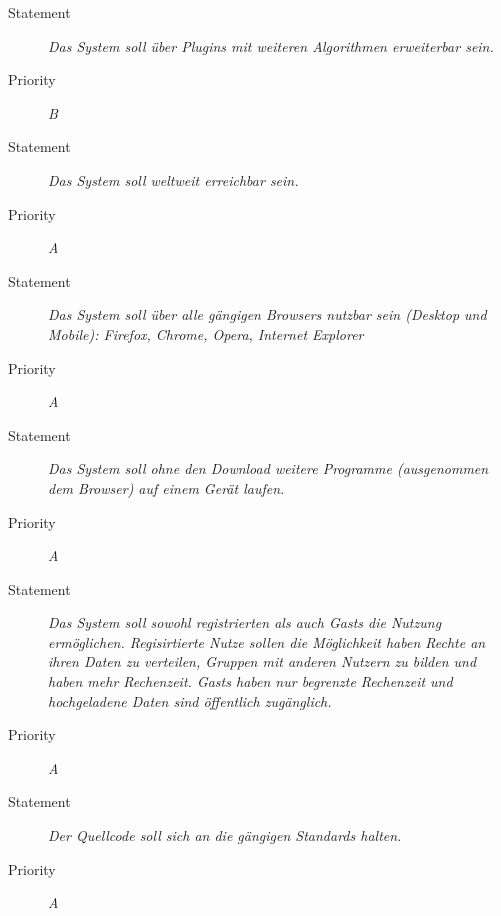 \UR
\begin{description}
\item[Statement] \textit{Das System soll über \gls{Plugins} mit weiteren Algorithmen erweiterbar sein.}
\item[Priority] \textit{B}
\end{description}

\UR
\begin{description}
\item[Statement] \textit{Das System soll weltweit erreichbar sein.}
\item[Priority] \textit{A}
\end{description}

\UR
\begin{description}
  \item[Statement]
    \textit{Das System soll über alle gängigen \glspl{Browser} nutzbar sein (Desktop und Mobile): Firefox, Chrome, Opera, Internet Explorer} %
  \item[Priority]
    \textit{A}
\end{description}

\UR
\begin{description}
\item[Statement] \textit{Das System soll ohne den Download weitere Programme (ausgenommen dem Browser) auf einem Gerät laufen.}
\item[Priority] \textit{A}
\end{description}

\UR
\begin{description}
\item[Statement] \textit{Das System soll sowohl registrierten als auch \glspl{Gast} die Nutzung ermöglichen. Regisirtierte Nutze sollen die Möglichkeit haben Rechte an ihren Daten zu verteilen, Gruppen mit anderen Nutzern zu bilden und haben mehr Rechenzeit. \glspl{Gast} haben nur begrenzte Rechenzeit und hochgeladene Daten sind öffentlich zugänglich.}
\item[Priority] \textit{A}
\end{description}

\UR
\begin{description}
\item[Statement] \textit{Der Quellcode soll sich an die gängigen Standards halten.}
\item[Priority] \textit{A}
\end{description}

